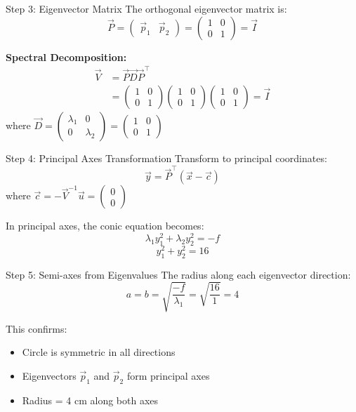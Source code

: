 \documentclass{beamer}
\newcommand{\myvec}[1]{\ensuremath{\begin{pmatrix}#1\end{pmatrix}}}
\begin{document}
	\begin{frame}{Step 3: Eigenvector Matrix}
		The orthogonal eigenvector matrix is:
		\begin{equation}
			\vec{P} = \myvec{\vec{p}_1 & \vec{p}_2} = \myvec{1 & 0\\0 & 1} = \vec{I}
		\end{equation}
		
		\textbf{Spectral Decomposition:}
		\begin{align}
			\vec{V} &= \vec{P}\vec{D}\vec{P}^\top\\
			&= \myvec{1 & 0\\0 & 1}\myvec{1 & 0\\0 & 1}\myvec{1 & 0\\0 & 1} = \vec{I}
		\end{align}
		where $\vec{D} = \myvec{\lambda_1 & 0\\0 & \lambda_2} = \myvec{1 & 0\\0 & 1}$
	\end{frame}
	
	\begin{frame}{Step 4: Principal Axes Transformation}
		Transform to principal coordinates:
		\begin{equation}
			\vec{y} = \vec{P}^\top(\vec{x} - \vec{c})
		\end{equation}
		where $\vec{c} = -\vec{V}^{-1}\vec{u} = \myvec{0\\0}$
		
		\vspace{1em}
		In principal axes, the conic equation becomes:
		\begin{equation}
			\lambda_1 y_1^2 + \lambda_2 y_2^2 = -f
		\end{equation}
		\begin{equation}
			y_1^2 + y_2^2 = 16
		\end{equation}
	\end{frame}
	
	\begin{frame}{Step 5: Semi-axes from Eigenvalues}
		The radius along each eigenvector direction:
		\begin{equation}
			a = b = \sqrt{\frac{-f}{\lambda_1}} = \sqrt{\frac{16}{1}} = 4
		\end{equation}
		
		This confirms:
		\begin{itemize}
			\item Circle is symmetric in all directions
			\item Eigenvectors $\vec{p}_1$ and $\vec{p}_2$ form principal axes
			\item Radius = 4 cm along both axes
		\end{itemize}
	\end{frame}
	
\end{document}
